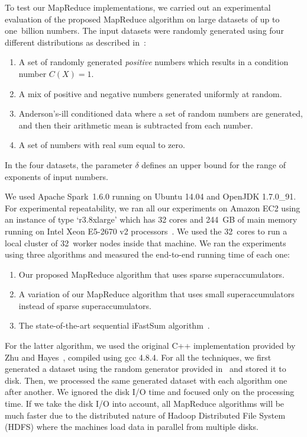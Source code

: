 \documentclass[11pt]{article}
\begin{document}
To test our MapReduce implementations, we carried out an experimental
evaluation of the proposed MapReduce algorithm on large datasets
of up to one~billion numbers. The input datasets were randomly
generated using four different distributions as described
in~\cite{doi:10.1137/070710020}:
\begin{enumerate}
\item  A set of randomly generated
{\em positive} numbers which results in a condition number $C(X)=1$.
\item
A mix of positive and negative numbers generated uniformly at
random. 
\item
Anderson's-ill conditioned data where a set of random
numbers are generated, and then their arithmetic mean is subtracted
from each number. 
\item
A set of numbers with real sum equal to zero.
\end{enumerate}
In the four datasets, the parameter $\delta$ defines an upper bound
for the range of exponents of input numbers.


We used Apache Spark~1.6.0 running on Ubuntu 14.04 and OpenJDK
1.7.0\_91. 
For experimental repeatability, we ran all our experiments
on Amazon EC2 using an instance of type `r3.8xlarge' which has 32
cores and 244~GB of main memory running on Intel Xeon E5-2670 v2
processors~\cite{xeonE5-2670}. We used the 32~cores to run a local
cluster of 32~worker nodes inside that machine. We ran the experiments
using three algorithms and measured the end-to-end running time of
each one:
\begin{enumerate}
\item Our proposed MapReduce algorithm that uses sparse
superaccumulators. 
\item A variation of our MapReduce algorithm that
uses small superaccumulators~\cite{Neal15a} instead of sparse
superaccumulators. 
\item The state-of-the-art sequential iFastSum
algorithm~\cite{Zhu:2010:A9O}. 
\end{enumerate}
For the latter algorithm,
we used the original C++ implementation
provided by Zhu and Hayes~\cite{Zhu:2010:A9O}, compiled using gcc
4.8.4. For all the techniques, we first generated a dataset using
the random generator provided in~\cite{Zhu:2010:A9O} and stored it
to disk. Then, we processed the same generated dataset with each
algorithm one after another. We ignored the disk I/O time and focused
only on the processing time. If we take the disk I/O into account,
all MapReduce algorithms will be much faster due to the distributed
nature of Hadoop Distributed File System (HDFS) where the machines
load data in parallel from multiple disks.
\end{document}
